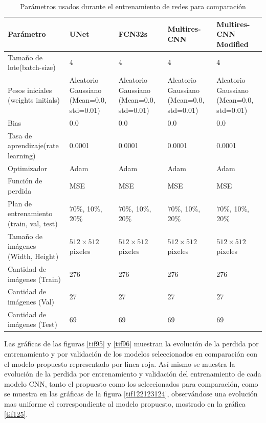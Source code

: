 \documentclass[10pt,letterpaper]{article}
\begin{document}
\begin{table}[H]
\begin{center}
\begin{tabular}{ p{1.8cm}  p{1.5cm}  p{1.5cm}  p{1.7cm}  p{2.3cm} }
\hline
Parámetro & UNet & FCN32s & Multires-CNN & Multires-CNN Modified\\	
\hline
Tamaño de lote(batch-size) & 4    & 4 & 4 & 4 \\
\hline
Pesos iniciales (weights initials) & Aleatorio Gaussiano (Mean=0.0, std=0.01)  & Aleatorio Gaussiano (Mean=0.0, std=0.01) & Aleatorio Gaussiano (Mean=0.0, std=0.01) & Aleatorio Gaussiano (Mean=0.0, std=0.01) \\
\hline
Bias                       & 0.0  & 0.0 & 0.0 & 0.0 \\
\hline
Tasa de aprendizaje(rate learning) & 0.0001  & 0.0001 & 0.0001 & 0.0001 \\
\hline
Optimizador                & Adam  & Adam & Adam & Adam \\
\hline
Función de perdida         & MSE & MSE & MSE & MSE \\
\hline
Plan de entrenamiento (train, val, test)& 70\%, 10\%, 20\%  & 70\%, 10\%, 20\% & 70\%, 10\%, 20\% & 70\%, 10\%, 20\% \\
\hline
Tamaño de imágenes (Width, Height)        & $512\times512$  pixeles & $512\times512$ pixeles & $512\times512$ pixeles & $512\times512$ pixeles \\
\hline
Cantidad de imágenes (Train) & 276  & 276 & 276 & 276 \\
\hline
Cantidad de imágenes (Val)   & 27  & 27 & 27 & 27 \\
\hline
Cantidad de imágenes (Test)  & 69  & 69 & 69 & 69 \\
\hline
\end{tabular}
\caption{Parámetros usados durante el entrenamiento de redes para comparación}
\label{Parametroscomparacion}
\end{center}
\end{table}


Las gráficas de las figuras \ref{tif95} y \ref{tif96} muestran la evolución de la perdida por entrenamiento y por validación de los modelos seleccionados en comparación con el modelo propuesto representado por linea roja. Así mismo se muestra la evolución de la perdida por entrenamiento y validación del entrenamiento de cada modelo CNN, tanto el propuesto como los seleccionados para comparación, como se muestra en las gráficas de la figura \ref{tif122123124}, observándose una evolución mas uniforme el correspondiente al modelo propuesto, mostrado en la gráfica \ref{tif125}.
\end{document}
